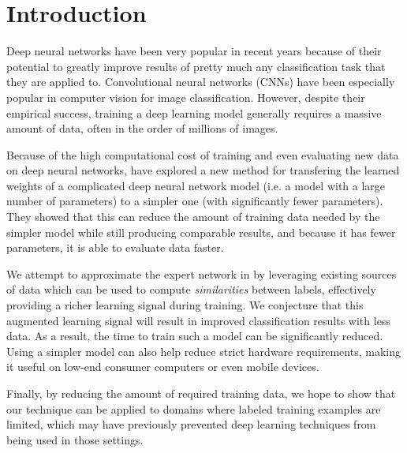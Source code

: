 \section{Introduction}

Deep neural networks have been very popular in recent years because of their
potential to greatly improve results of pretty much any classification task
that they are applied to.
Convolutional neural networks (CNNs) have been especially popular in computer
vision for image classification.
However, despite their empirical success, training a deep learning model
generally requires a massive amount of data, often in the order of millions of
images.

Because of the high computational cost of training and even evaluating new data
on deep neural networks, \cite{hinton2015distilling} have explored a new method
for transfering the learned weights of a complicated deep neural network model
(i.e. a model with a large number of parameters) to a simpler one (with
significantly fewer parameters). They showed that this can reduce the amount of
training data needed by the simpler model while still producing comparable
results, and because it has fewer parameters, it is able to evaluate data
faster.

We attempt to approximate the expert network in \cite{hinton2015distilling} by
leveraging existing sources of data which can be used to compute
\emph{similarities} between labels, effectively providing a richer learning
signal during training. We conjecture that this augmented learning signal will
result in improved classification results with less data.  As a result, the time
to train such a model can be significantly reduced. Using a simpler model can
also help reduce strict hardware requirements, making it useful on low-end
consumer computers or even mobile devices.

Finally, by reducing the amount of required training data, we hope to show that
our technique can be applied to domains where labeled training examples are
limited, which may have previously prevented deep learning techniques from being
used in those settings.

